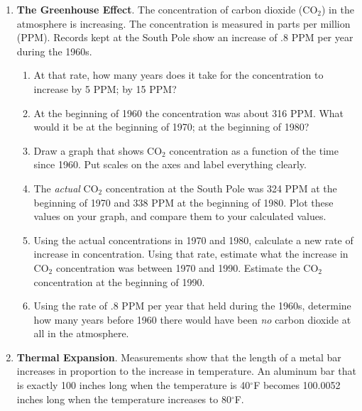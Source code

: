 \begin{enumerate}
\begin{enumerate}
  \item Is there any temperature that has the same reading on the two
temperature scales?  What is it?  Does the temperature of the air ever
reach this value?  Where?



\end{enumerate}
\item {\bf The Greenhouse Effect}. The
concentration of carbon dioxide (CO$_2$) in the
atmosphere is increasing.  The concentration is measured in parts per
million (PPM).  Records kept at the South Pole show an increase of .8
PPM per year during the 1960s.

  \begin{enumerate}
  \item At that rate, how many years does it take for the concentration
to increase by 5 PPM; by 15 PPM?

  \item At the beginning of 1960 the concentration was about 316 PPM.
What would it be at the beginning of 1970; at the beginning of 1980?

  \item Draw a graph that shows CO$_2$ concentration as a function of the
time since 1960.  Put scales on the axes and label everything clearly.

  \item The {\em actual\/} CO$_2$ concentration at the South Pole was 324
PPM at the beginning of 1970 and 338 PPM at the beginning of 1980.
Plot these values on your graph, and compare them to your calculated
values.

  \item Using the actual concentrations in 1970 and 1980, calculate a new
rate of increase in concentration.  Using that rate, estimate what the
increase in CO$_2$ concentration was between 1970 and 1990.  Estimate
the CO$_2$ concentration at the beginning of 1990.

  \item Using the rate of .8 PPM per year that held during the 1960s,
determine how many years before 1960 there would have been {\em no\/}
carbon dioxide at all in the atmosphere.



\end{enumerate}
\item {\bf Thermal Expansion}. Measurements
show that the length of a metal bar increases in proportion to the
increase in temperature.  An aluminum bar that is exactly 100 inches
long when the temperature is 40$^\circ$F becomes 100.0052 inches long
when the temperature increases to 80$^\circ$F.


\end{enumerate}
